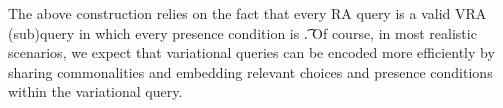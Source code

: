 \noindent
%
The above construction relies on the fact that every RA query is a valid VRA
(sub)query in which every presence condition is \t.
%
Of course, in most realistic scenarios, we expect that variational queries can be encoded
more efficiently by sharing commonalities and embedding relevant choices and
presence conditions within the variational query.


%
%
%



%




%